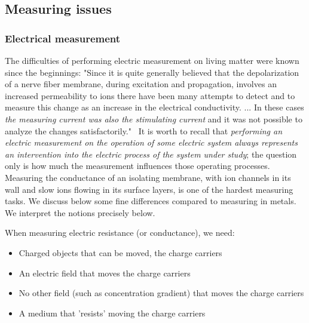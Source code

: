 
\subsection[Measuring issues]{Measuring issues\label{sec:PHYSICS_MEASURING}}


\subsubsection{Electrical measurement\label{sec:Physics-MeasurementElectrical}}
The difficulties of performing \hypertarget{electric_conductance}{electric measurement} on living matter
were known since the beginnings: "Since it is quite generally
believed that the depolarization of a nerve fiber membrane, during
excitation and propagation, involves an increased permeability to
ions there have been many attempts to detect and to measure this
change as an increase in the electrical conductivity. ...
In these cases \textit{the measuring current was also the stimulating current} and it was not possible
to analyze the changes satisfactorily."~\cite{COLE_CURTIS_IMPEDANCE:1939}
It is worth to recall that \textit{performing an electric measurement 
on the operation of some electric system always represents an intervention into the 
electric process of the system under study}; the question only is how much the measurement influences those operating processes.
Measuring the conductance of an isolating membrane, with ion channels in its wall and 
slow ions flowing in its surface layers, is one of the hardest measuring tasks.
We discuss below some fine differences compared to measuring in metals.
We interpret the notions precisely below.

When measuring \hypertarget{electric_resistance}{electric resistance} (or conductance), we need:
\begin{itemize}
 \item Charged objects that can be moved, the charge carriers
 \item An electric field that moves the charge carriers
 \item No other field (such as concentration gradient) that moves the charge carriers
 \item A medium that 'resists' moving the charge carriers
\end{itemize}



